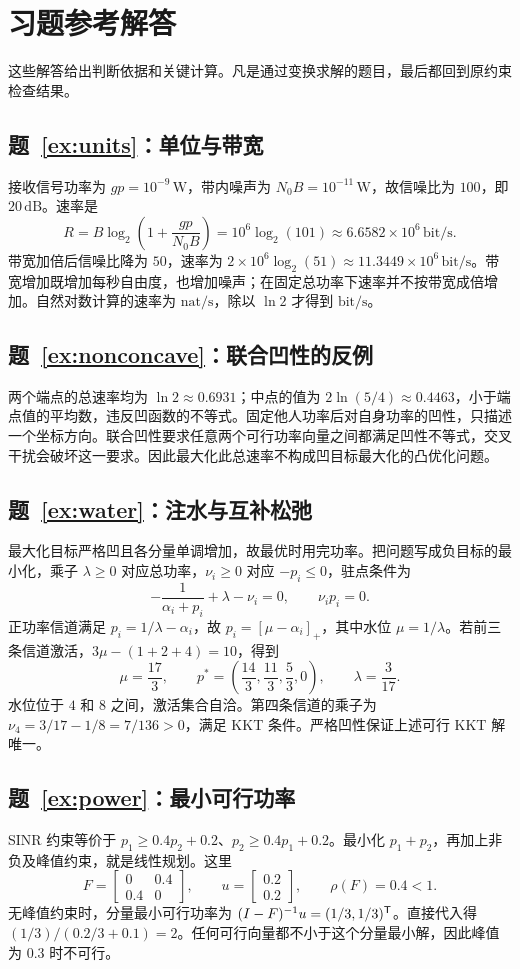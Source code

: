\chapter{习题参考解答}
\label{app:solutions}
这些解答给出判断依据和关键计算。凡是通过变换求解的题目，最后都回到原约束检查结果。

\section*{题~\ref{ex:units}：单位与带宽}
接收信号功率为 $gp=10^{-9}\,\mathrm W$，带内噪声为 $N_0B=10^{-11}\,\mathrm W$，故信噪比为 $100$，即 $20\,\mathrm{dB}$。速率是
\[
 R=B\log_2\!\left(1+\frac{gp}{N_0B}\right)
 =10^6\log_2(101)\approx6.6582\times10^6\,\mathrm{bit/s}.
\]
带宽加倍后信噪比降为 $50$，速率为 $2\times10^6\log_2(51)\approx11.3449\times10^6\,\mathrm{bit/s}$。带宽增加既增加每秒自由度，也增加噪声；在固定总功率下速率并不按带宽成倍增加。自然对数计算的速率为 $\mathrm{nat/s}$，除以 $\ln2$ 才得到 $\mathrm{bit/s}$。

\section*{题~\ref{ex:nonconcave}：联合凹性的反例}
两个端点的总速率均为 $\ln2\approx0.6931$；中点的值为 $2\ln(5/4)\approx0.4463$，小于端点值的平均数，违反凹函数的不等式。固定他人功率后对自身功率的凹性，只描述一个坐标方向。联合凹性要求任意两个可行功率向量之间都满足凹性不等式，交叉干扰会破坏这一要求。因此最大化此总速率不构成凹目标最大化的凸优化问题。

\section*{题~\ref{ex:water}：注水与互补松弛}
最大化目标严格凹且各分量单调增加，故最优时用完功率。把问题写成负目标的最小化，乘子 $\lambda\geq0$ 对应总功率，$\nu_i\geq0$ 对应 $-p_i\leq0$，驻点条件为
\[
 -\frac1{\alpha_i+p_i}+\lambda-\nu_i=0,
 \qquad \nu_i p_i=0.
\]
正功率信道满足 $p_i=1/\lambda-\alpha_i$，故 $p_i=[\mu-\alpha_i]_+$，其中水位 $\mu=1/\lambda$。若前三条信道激活，$3\mu-(1+2+4)=10$，得到
\[
 \mu=\frac{17}{3},\qquad
 p^*=\left(\frac{14}{3},\frac{11}{3},\frac{5}{3},0\right),
 \qquad\lambda=\frac3{17}.
\]
水位位于 $4$ 和 $8$ 之间，激活集合自洽。第四条信道的乘子为 $\nu_4=3/17-1/8=7/136>0$，满足 KKT 条件。严格凹性保证上述可行 KKT 解唯一。

\section*{题~\ref{ex:power}：最小可行功率}
SINR 约束等价于 $p_1\geq0.4p_2+0.2$、$p_2\geq0.4p_1+0.2$。最小化 $p_1+p_2$，再加上非负及峰值约束，就是线性规划。这里
\[
 F=\begin{bmatrix}0&0.4\\0.4&0\end{bmatrix},\qquad
 u=\begin{bmatrix}0.2\\0.2\end{bmatrix},\qquad
 \rho(F)=0.4<1.
\]
无峰值约束时，分量最小可行功率为 $(I-F)^{-1}u=(1/3,1/3)^{\mathsf T}$。直接代入得 $(1/3)/(0.2/3+0.1)=2$。任何可行向量都不小于这个分量最小解，因此峰值为 $0.3$ 时不可行。

